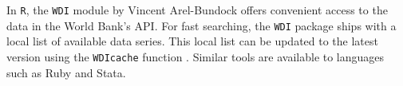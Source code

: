 In \texttt{R}, the \texttt{WDI} module by Vincent Arel-Bundock offers convenient access to the data in the World Bank's API. For fast searching, the \texttt{WDI} package ships with a local list of available data series. This local list can be updated to the latest version using the \texttt{WDIcache} function \parencite{wb_r}. Similar tools are available to languages such as Ruby and Stata.











